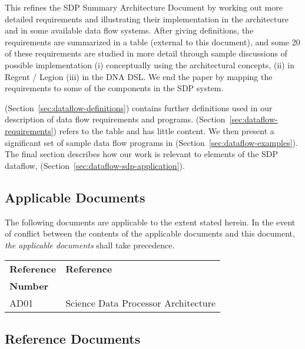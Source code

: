 \documentclass[11pt,a4paper]{article}
\begin{document}
\sdpfrontpage

\sdptableofcontents

\sdplistoffigures

\sdplistoftables

\sdpsummary

This refines the SDP Summary Architecture Document by working out more detailed requirements and illustrating their implementation in the architecture and in some available data flow systems.  After giving definitions, the requirements are summarized in a table (external to this document), and some 20 of these requirements are studied in more detail through sample discussions of possible implementation (i) conceptually using the architectural concepts, (ii) in Regent / Legion (iii) in the DNA DSL.  We end the paper by mapping the requirements to some of the components in the SDP system.


(Section~\ref{sec:dataflow-definitions}) contains further definitions used in our description of data flow requirements and programs. 
(Section~\ref{sec:dataflow-requirements}) refers to the table and has little content.    We then present a significant set of sample data flow programs in 
(Section~\ref{sec:dataflow-examples}). The final section describes how our work is relevant to elements of the SDP dataflow, 
(Section~\ref{sec:dataflow-sdp-application}).


\sdpreferencedocs

\subsection*{Applicable Documents}

\iffalse
The following documents are applicable to the extent stated herein. In the
event of conflict between the contents of the applicable documents and this
document, \emph{the applicable documents} shall take precedence.

\begin{center}{
\begin{tabularx}{\textwidth}{|X|X|}
    \hline
    \bf{Reference} & \bf{Reference}\\
    \bf{Number} & \\
    \hline
    AD01 & Science Data Processor Architecture\\\hline
\end{tabularx}}
\end{center}

\subsection*{Reference Documents}
\end{document}
